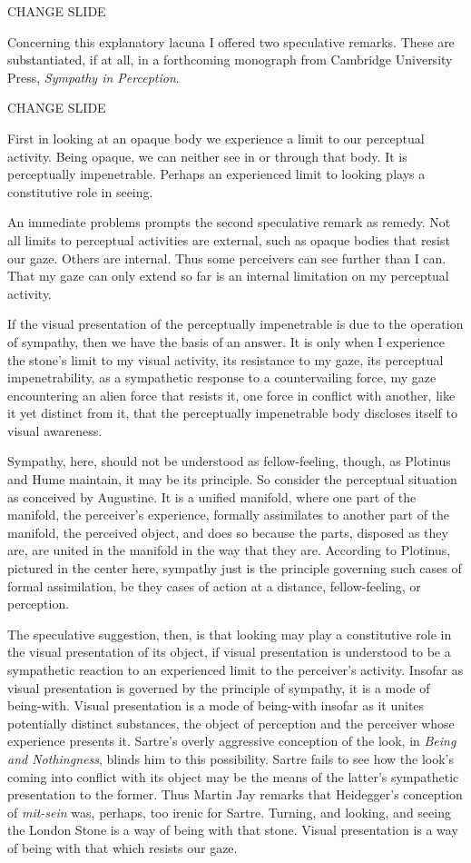 \documentclass[12pt]{article}
\begin{document}
CHANGE SLIDE

Concerning this explanatory lacuna I offered two speculative remarks. These are substantiated, if at all, in a forthcoming monograph from Cambridge University Press, \emph{Sympathy in Perception}.

CHANGE SLIDE

First in looking at an opaque body we experience a limit to our perceptual activity. Being opaque, we can neither see in or through that body. It is perceptually impenetrable. Perhaps an experienced limit to looking plays a constitutive role in seeing. 

An immediate problems prompts the second speculative remark as remedy. Not all limits to perceptual activities are external, such as opaque bodies that resist our gaze. Others are internal. Thus some perceivers can see further than I can. That my gaze can only extend so far is an internal limitation on my perceptual activity. 

If the visual presentation of the perceptually impenetrable is due to the operation of sympathy, then we have the basis of an answer. It is only when I experience the stone’s limit to my visual activity, its resistance to my gaze, its perceptual impenetrability, as a sympathetic response to a countervailing force, my gaze encountering an alien force that resists it, one force in conflict with another, like it yet distinct from it, that the perceptually impenetrable body discloses itself to visual awareness.

Sympathy, here, should not be understood as fellow-feeling, though, as Plotinus and Hume maintain, it may be its principle. So consider the perceptual situation as conceived by Augustine. It is a unified manifold, where one part of the manifold, the perceiver's experience, formally assimilates to another part of the manifold, the perceived object, and does so because the parts, disposed as they are, are united in the manifold in the way that they are. According to Plotinus, pictured in the center here, sympathy just is the principle governing such cases of formal assimilation, be they cases of action at a distance, fellow-feeling, or perception. 

The speculative suggestion, then, is that looking may play a constitutive role
in the visual presentation of its object, if visual presentation is understood to be a sympathetic reaction to an experienced limit to the perceiver’s activity. Insofar as visual presentation is governed by the principle of sympathy, it is a mode of being-with. Visual presentation is a mode of being-with insofar as it unites potentially distinct substances, the object of perception and the perceiver whose experience presents it. Sartre’s overly aggressive conception of the look, in \emph{Being and Nothingness}, blinds him to this possibility. Sartre fails to see how the look’s coming into conflict with its object may be the means of the latter’s sympathetic presentation to the former. Thus Martin Jay remarks that Heidegger’s conception of \emph{mit-sein} was, perhaps, too irenic for Sartre. Turning, and looking, and seeing the London Stone is a way of being with that stone. Visual presentation is a way of being with that which resists our gaze.
\end{document}
